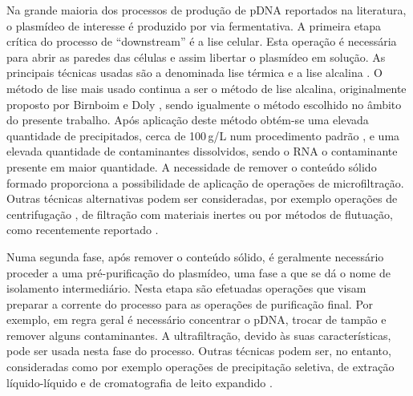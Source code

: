 Na grande maioria dos processos de produção de pDNA reportados na literatura, o plasmídeo de interesse é produzido por via fermentativa. A primeira etapa crítica do processo de ``downstream'' é a lise celular. Esta operação é necessária para abrir as paredes das células e assim libertar o plasmídeo em solução. As principais técnicas usadas são a denominada lise térmica \cite{holmes,zhu,mahony,lander} e a lise alcalina \cite{birnboim,chamsart,urthaler,meacle}. O método de lise mais usado continua a ser o método de lise alcalina, originalmente proposto por Birnboim e Doly \cite{birnboim}, sendo igualmente o método escolhido no âmbito do presente trabalho. Após aplicação deste método obtém-se uma elevada quantidade de precipitados, cerca de 100\,g/L num procedimento  padrão \cite{theo}, e uma elevada quantidade de contaminantes dissolvidos, sendo o RNA o contaminante presente em maior quantidade. A necessidade de remover o conteúdo sólido formado proporciona a possibilidade de aplicação de operações de microfiltração. Outras técnicas alternativas podem ser consideradas, por exemplo operações de centrifugação \cite{flowsheets}, de filtração com materiais inertes \cite{urthaler} ou por métodos de flutuação, como recentemente reportado \cite{blom}. 

Numa segunda fase, após remover o conteúdo sólido, é geralmente necessário proceder a uma pré-purificação do plasmídeo, uma fase a que se dá o nome de isolamento intermediário. Nesta etapa são efetuadas operações que visam preparar a corrente do processo para as operações de purificação final. Por exemplo, em regra geral é necessário concentrar o pDNA, trocar de tampão e remover alguns contaminantes. A ultrafiltração, devido às suas características, pode ser usada nesta fase do processo. Outras técnicas podem ser, no entanto, consideradas como por exemplo operações de precipitação seletiva, de extração líquido-líquido e de cromatografia de leito expandido \cite{flowsheets}.   

